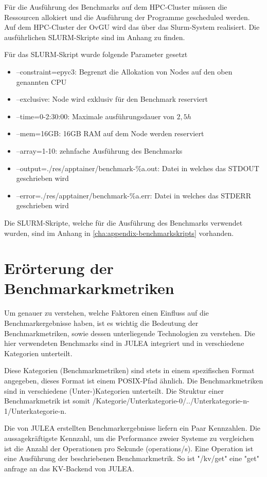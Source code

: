 Für die Ausführung des Benchmarks auf dem HPC-Cluster müssen die Ressourcen allokiert und die Ausführung der Programme gescheduled werden. Auf dem HPC-Cluster der OvGU wird das über das Slurm-System realisiert. Die ausführlichen SLURM-Skripte sind im Anhang zu finden.

Für das SLURM-Skript wurde folgende Parameter gesetzt

\begin{itemize}
    \item --constraint=epyc3: Begrenzt die Allokation von Nodes auf den oben genannten CPU
    \item --exclusive: Node wird exklusiv für den Benchmark reserviert
    \item --time=0-2:30:00: Maximale ausführungsdauer von $2,5h$
    \item --mem=16GB: 16GB RAM auf dem Node werden reserviert
    \item --array=1-10: zehnfache Ausführung des Benchmarks
    \item --output=./res/apptainer/benchmark-\%a.out: Datei in welches das STDOUT geschrieben wird
    \item --error=./res/apptainer/benchmark-\%a.err: Datei in welches das STDERR geschrieben wird 
\end{itemize}

Die SLURM-Skripte, welche für die Ausführung des Benchmarks verwendet wurden, sind im Anhang in \cref{cha:appendix-benchmarkskripts} vorhanden.

\section{Erörterung der Benchmarkarkmetriken}

Um genauer zu verstehen, welche Faktoren einen Einfluss auf die Benchmarkergebnisse haben, ist es wichtig die Bedeutung der Benchmarkmetriken, sowie dessen unterliegende Technologien zu verstehen. 
Die hier verwendeten Benchmarks sind in JULEA integriert und in verschiedene Kategorien unterteilt.

Diese Kategorien (Benchmarkmetriken) sind stets in einem spezifischen Format angegeben, dieses Format ist einem POSIX-Pfad ähnlich. Die Benchmarkmetriken sind in verschiedene (Unter-)Kategorien unterteilt. Die Struktur einer Benchmarkmetrik ist somit /Kategorie/Unterkategorie-0/../Unterkategorie-n-1/Unterkategorie-n.

Die von JULEA erstellten Benchmarkergebnisse liefern ein Paar Kennzahlen. Die aussagekräftigste Kennzahl, um die Performance zweier Systeme zu vergleichen ist die Anzahl der Operationen pro Sekunde (operations/s). Eine Operation ist eine Ausführung der beschriebenen Benchmarkmetrik. So ist "/kv/get" eine "get" anfrage an das KV-Backend von JULEA. 

